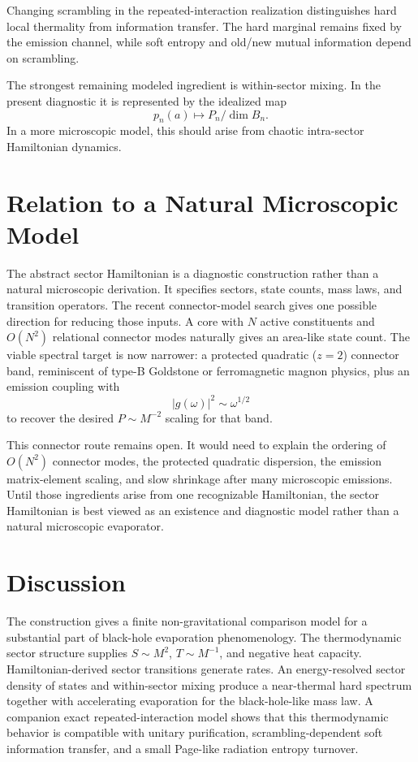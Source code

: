 \documentclass[aps,prd,onecolumn,longbibliography,nofootinbib]{revtex4-2}
\begin{document}
Changing scrambling in the repeated-interaction realization distinguishes hard
local thermality from information transfer.  The hard marginal remains fixed
by the emission channel, while soft entropy and old/new mutual information
depend on scrambling.

The strongest remaining modeled ingredient is within-sector mixing.  In the
present diagnostic it is represented by the idealized map
\begin{equation}
    p_n(a)\mapsto P_n/\dim B_n .
\end{equation}
In a more microscopic model, this should arise from chaotic intra-sector
Hamiltonian dynamics.

\section{Relation to a Natural Microscopic Model}
\label{sec:natural}

The abstract sector Hamiltonian is a diagnostic construction rather than a
natural microscopic derivation.  It specifies sectors, state counts, mass laws,
and transition operators.  The recent connector-model search gives one possible
direction for reducing those inputs.  A core with $N$ active constituents and
$O(N^2)$ relational connector modes naturally gives an area-like state count.
The viable spectral target is now narrower: a protected quadratic
($z=2$) connector band, reminiscent of type-B Goldstone or ferromagnetic
magnon physics, plus an emission coupling with
\begin{equation}
    |g(\omega)|^2\sim \omega^{1/2}
\end{equation}
to recover the desired $P\sim M^{-2}$ scaling for that band.

This connector route remains open.  It would need to explain the ordering of
$O(N^2)$ connector modes, the protected quadratic dispersion, the emission
matrix-element scaling, and slow shrinkage after many microscopic emissions.
Until those ingredients arise from one recognizable Hamiltonian, the sector
Hamiltonian is best viewed as an existence and diagnostic model rather than a
natural microscopic evaporator.

\section{Discussion}

The construction gives a finite non-gravitational comparison model for a
substantial part of black-hole evaporation phenomenology.  The thermodynamic
sector structure supplies $S\sim M^2$, $T\sim M^{-1}$, and negative heat
capacity.  Hamiltonian-derived sector transitions generate rates.  An
energy-resolved sector density of states and within-sector mixing produce a
near-thermal hard spectrum together with accelerating evaporation for the
black-hole-like mass law.  A companion exact repeated-interaction model shows
that this thermodynamic behavior is compatible with unitary purification,
scrambling-dependent soft information transfer, and a small Page-like
radiation entropy turnover.
\end{document}
